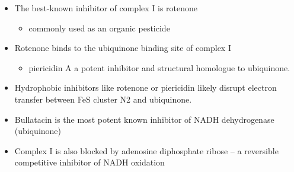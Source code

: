 \documentclass{scrartcl}
\begin{document}
\begin{enumerate}
\begin{itemize}
\item The best-known inhibitor of complex I is rotenone
\begin{itemize}
\item commonly used as an organic pesticide
\end{itemize}
\item Rotenone binds to the ubiquinone binding site of complex I
\begin{itemize}
\item piericidin A a potent inhibitor and structural homologue to ubiquinone.
\end{itemize}
\item Hydrophobic inhibitors like rotenone or piericidin likely disrupt electron transfer between FeS cluster N2 and ubiquinone.
\item Bullatacin is the most potent known inhibitor of NADH dehydrogenase (ubiquinone)
\item Complex I is also blocked by adenosine diphosphate ribose – a reversible competitive inhibitor of NADH oxidation
\end{itemize}
\end{enumerate}
\end{document}
